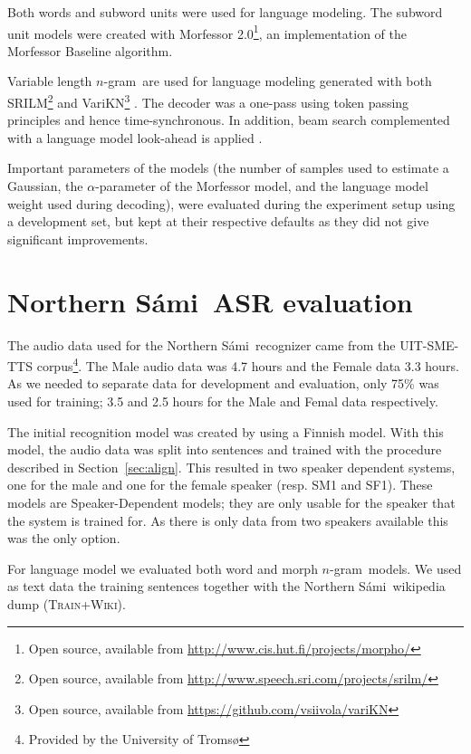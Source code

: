 \documentclass[b5paper]{article}
\newcommand{\ns}{Northern Sámi}
\newcommand{\ngram}{$n$-gram}
\newcommand{\ds}[1]{\textsc{#1}}
\begin{document}
Both words and subword units were used for language modeling. The subword unit models were created with Morfessor 2.0\footnote{Open source, available from \url{http://www.cis.hut.fi/projects/morpho/}}, an implementation of the Morfessor Baseline algorithm\cite{virpioja2013morfessor}. 

Variable length \ngram\ are used for language modeling generated with both SRILM\footnote{Open source, available from \url{http://www.speech.sri.com/projects/srilm/}} \cite{stolcke2002srilm} and VariKN\footnote{Open source, available from \url{https://github.com/vsiivola/variKN}} \cite{siivola2007growing,siivola2007morfessor}. The decoder was a one-pass using token passing principles and hence time-synchronous. In addition, beam search complemented with a language model look-ahead is applied \cite{ortmanns1997look}.

Important parameters of the models (the number of samples used to estimate a Gaussian, the $\alpha$-parameter of the Morfessor model, and the language model weight used during decoding), were evaluated during the experiment setup using a development set, but kept at their respective defaults as they did not give significant improvements.



\section{\ns\ ASR evaluation} 
\label{sec:samiexp}
The audio data used for the \ns\ recognizer came from the UIT-SME-TTS corpus\footnote{Provided by the University of Tromsø}. The Male audio data was 4.7 hours and the Female data 3.3 hours. As we needed to separate data for development and evaluation, only 75\% was used for training; 3.5 and 2.5 hours for the Male and Femal data respectively.

The initial recognition model was created by using a Finnish model. With this model, the audio data was split into sentences and trained with the procedure described in Section~\ref{sec:align}. This resulted in two speaker dependent systems, one for the male and one for the female speaker (resp. SM1 and SF1). These models are Speaker-Dependent models; they are only usable for the speaker that the system is trained for. As there is only data from two speakers available this was the only option. 

For language model we evaluated both word and morph \ngram\ models. We used as text data the training sentences together with the \ns\ wikipedia dump (\ds{Train+Wiki}).
\end{document}
